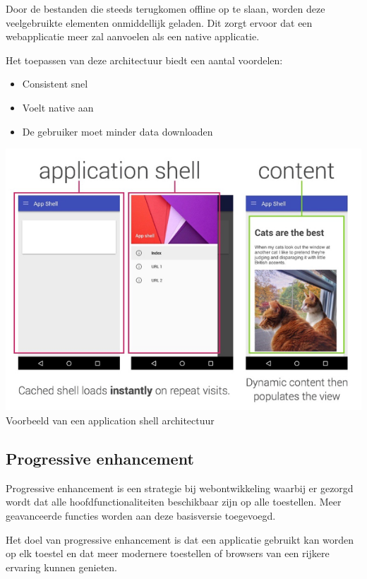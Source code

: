 Door de bestanden die steeds terugkomen offline op te slaan, worden deze veelgebruikte elementen onmiddellijk geladen. Dit zorgt ervoor dat een webapplicatie meer zal aanvoelen als een native applicatie.

Het toepassen van deze architectuur biedt een aantal voordelen:

\begin{itemize}
	\item	Consistent snel
	\item	Voelt native aan
	\item	De gebruiker moet minder data downloaden
\end{itemize}


\autocite{Osmani2019a}

\includegraphics{./img/ApplicationShell.png}{Voorbeeld van een application shell architectuur \autocite{Osmani2015}}



\subsection{Progressive enhancement}
Progressive enhancement is een strategie bij webontwikkeling waarbij er gezorgd wordt dat alle hoofdfunctionaliteiten beschikbaar zijn op alle toestellen. Meer geavanceerde functies worden aan deze basisversie toegevoegd. 

Het doel van progressive enhancement is dat een applicatie gebruikt kan worden op elk toestel en dat meer modernere toestellen of browsers van een rijkere ervaring kunnen genieten.

\autocite{Vanhala2017}

